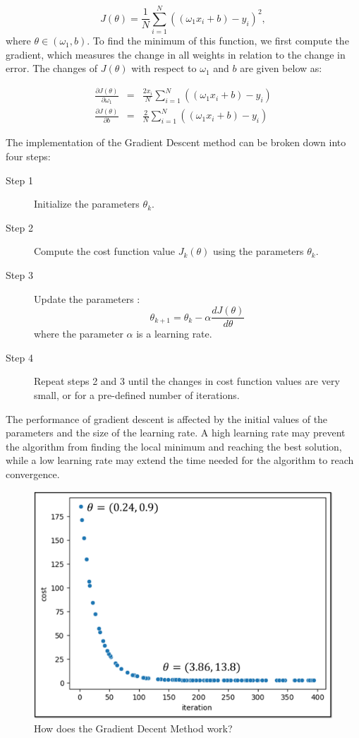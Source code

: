 {\begin{equation}\label{eq:costGDS}
  J(\theta) = \frac{1}{N} \sum_{i=1}^N \left((\omega_1 x_i + b) - y_i\right)^2,
\end{equation} where $\theta \in (\omega_1, b)$. To find the minimum of this function, we first compute the gradient, which measures the change in all weights in relation to the change in error. The changes of $J(\theta)$ with respect to $\omega_1$ and $b$ are given below as:

\begin{eqnarray}
  \frac{\partial J(\theta)}{\partial \omega_1} &=& \frac{2x_i}{N} \sum_{i=1}^N \left((\omega_1 x_i + b) - y_i\right)\\
  \frac{\partial J(\theta)}{\partial b} &=& \frac{2}{N} \sum_{i=1}^N \left((\omega_1 x_i + b) - y_i\right)
\end{eqnarray}

\newpage
\noindent The implementation of the Gradient Descent method can be broken down into four steps:

\begin{description}
  \item[Step 1] Initialize the parameters $\theta_k$.
  \item[Step 2] Compute the cost function value $J_k(\theta)$ using the parameters $\theta_k$.
  \item[Step 3] Update the parameters :
  \begin{equation}
  \theta_{k+1} = \theta_k - \alpha \frac{d J(\theta)}{d\theta}
  \end{equation} where the parameter $\alpha$ is a learning rate.
  \item[Step 4] Repeat steps 2 and 3 until the changes in cost function values are very small, or for a pre-defined number of iterations.
\end{description}

The performance of gradient descent is affected by the initial values of the parameters and the size of the learning rate. A high learning rate may prevent the algorithm from finding the local minimum and reaching the best solution, while a low learning rate may extend the time needed for the algorithm to reach convergence.

\begin{figure}[!h]
  \centering
  \includegraphics[width=7.5 cm]{gds_rate.jpg}
  \caption{How does the Gradient Decent Method work?}
  \label{fig:gdsRate}
\end{figure}

}

